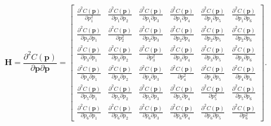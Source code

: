 \documentclass[12pt,oneside,openany,a4paper, %
english, %
masters-t, goldenblock]{usthesis}
\begin{document}
\begin{equation}
  \label{eq: hessian}
  \bm{H}=\frac{\partial^2 C(\bm{p})}{\partial \bm{p} \partial \bm{p}}=\begin{bmatrix}
  \frac{\partial^2 C(\bm{p})}{\partial p_1^2} &
  \frac{\partial^2 C(\bm{p})}{\partial p_1 \partial p_2} &
  \frac{\partial^2 C(\bm{p})}{\partial p_1 \partial p_3} &
  \frac{\partial^2 C(\bm{p})}{\partial p_1 \partial p_4} &
  \frac{\partial^2 C(\bm{p})}{\partial p_1 \partial p_5} &
  \frac{\partial^2 C(\bm{p})}{\partial p_1 \partial p_6} \\
  \frac{\partial^2 C(\bm{p})}{\partial p_2 \partial p_1} &
  \frac{\partial^2 C(\bm{p})}{\partial p_2^2} &
  \frac{\partial^2 C(\bm{p})}{\partial p_2 \partial p_3} &
  \frac{\partial^2 C(\bm{p})}{\partial p_2 \partial p_4} &
  \frac{\partial^2 C(\bm{p})}{\partial p_2 \partial p_5} &
  \frac{\partial^2 C(\bm{p})}{\partial p_2 \partial p_6} \\
  \frac{\partial^2 C(\bm{p})}{\partial p_3 \partial p_1} &
  \frac{\partial^2 C(\bm{p})}{\partial p_3 \partial p_2} &
  \frac{\partial^2 C(\bm{p})}{\partial p_3^2} &
  \frac{\partial^2 C(\bm{p})}{\partial p_3 \partial p_4} &
  \frac{\partial^2 C(\bm{p})}{\partial p_3 \partial p_5} &
  \frac{\partial^2 C(\bm{p})}{\partial p_3 \partial p_6} \\
  \frac{\partial^2 C(\bm{p})}{\partial p_4 \partial p_1} &
  \frac{\partial^2 C(\bm{p})}{\partial p_4 \partial p_2} &
  \frac{\partial^2 C(\bm{p})}{\partial p_4 \partial p_3} &
  \frac{\partial^2 C(\bm{p})}{\partial p_4^2} &
  \frac{\partial^2 C(\bm{p})}{\partial p_4 \partial p_5} &
  \frac{\partial^2 C(\bm{p})}{\partial p_4 \partial p_6} \\
  \frac{\partial^2 C(\bm{p})}{\partial p_5 \partial p_1} &
  \frac{\partial^2 C(\bm{p})}{\partial p_5 \partial p_2} &
  \frac{\partial^2 C(\bm{p})}{\partial p_5 \partial p_3} &
  \frac{\partial^2 C(\bm{p})}{\partial p_5 \partial p_4} &
  \frac{\partial^2 C(\bm{p})}{\partial p_5^2} &
  \frac{\partial^2 C(\bm{p})}{\partial p_5 \partial p_6} \\
  \frac{\partial^2 C(\bm{p})}{\partial p_6 \partial p_1} &
  \frac{\partial^2 C(\bm{p})}{\partial p_6 \partial p_2} &
  \frac{\partial^2 C(\bm{p})}{\partial p_6 \partial p_3} &
  \frac{\partial^2 C(\bm{p})}{\partial p_6 \partial p_4} &
  \frac{\partial^2 C(\bm{p})}{\partial p_6 \partial p_5} &
  \frac{\partial^2 C(\bm{p})}{\partial p_6^2} 
  \end{bmatrix}.
\end{equation}
\end{document}
